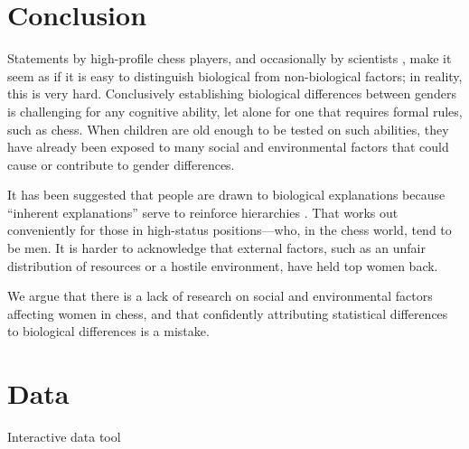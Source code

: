 \documentclass[9pt,twocolumn,twoside,lineno]{pnas-new}
\begin{document}



\section*{Conclusion}
Statements by high-profile chess players, and occasionally by scientists \cite{howard2014jbs}, make it seem as if it is easy to  distinguish biological from non-biological factors; in reality, this is very hard. Conclusively establishing biological differences between genders is challenging for any cognitive ability, let alone for one that requires formal rules, such as chess. When children are old enough to be tested on such abilities, they have already been exposed to many social and environmental factors that could cause or contribute to gender differences.

It has been suggested that people are drawn to biological explanations because ``inherent explanations” serve to reinforce hierarchies \cite{hussak2015early}. That works out conveniently for those in high-status positions—who, in the chess world, tend to be men. It is harder to acknowledge that external factors, such as an unfair distribution of resources or a hostile environment, have held top women back.

We argue that there is a lack of research on social and environmental factors affecting women in chess, and that confidently attributing statistical differences to biological differences is a mistake.

\section*{Data}
Interactive data tool
\end{document}
